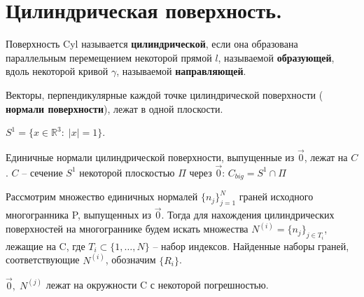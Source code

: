 \chapter{Цилиндрическая поверхность.}

\begin{definition}
	Поверхность Cyl называется {\color{Black} \textbf{цилиндрической}}, если она образована параллельным перемещением некоторой прямой $l$, называемой {\color{Black} \textbf{образующей}}, вдоль некоторой кривой $\gamma$, называемой {\color{Black} \textbf{направляющей}}.
\end{definition}

\begin{conseq}
	Векторы, перпендикулярные каждой точке цилиндрической поверхности ({\color{Black} \textbf{нормали поверхности}}), лежат в одной плоскости.
\end{conseq}

\begin{definition}
	$S^1 = \{ x \in \mathbb{R}^3: \; |x| = 1 \}$.
\end{definition}

\begin{conseq}
	Единичные нормали цилиндрической поверхности, выпущенные из $\vec{0}$, лежат на $C$. $C$ -- сечение $S^1$ некоторой плоскостью $\Pi$ через $\vec{0}$: $C_{big} = S^1 \cap \Pi$

	\vspace{1cm}
	\begin{figure}[h!]
	\end{figure}\vspace{0.5cm}
\end{conseq} \newpage

Рассмотрим множество единичных нормалей $\{ n_j \}_{j = 1}^N$ граней исходного многогранника P, выпущенных из $\vec{0}.$ 
Тогда для нахождения цилиндрических поверхностей на многограннике будем искать множества $N^{(i)} = \{ n_j \}_{j \in T_i}$, лежащие на C, где $T_i \subset \{ 1, \ldots, N\}$ -- набор индексов. Найденные наборы граней, соответствующие $N^{(i)}$, обозначим $\{ R_i\}$.

\begin{remark}
	$\vec{0}, \; N^{(j)}$ лежат на окружности C с некоторой погрешностью.
\end{remark}

